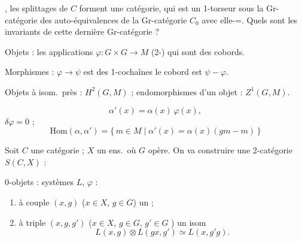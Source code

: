 \documentclass[11pt,a4paper]{article}
\begin{document}
\struck{\ill} , les splittages de $C$ forment une
catégorie, qui est un 1-torseur sous la Gr-catégorie des auto-équivalences
de la Gr-catégorie $C_0$ avec elle-=. Quels sont les invariants de cette
dernière Gr-catégorie ?

Objets : les applications $\varphi : G \times G \to M$
(2-) qui sont des cobords.

Morphismes : $\varphi \to \psi$ est  des 1-cochaînes
 le cobord est $\psi - \varphi$.

Objets à isom.\ près : $H^2(G,M)$ ; endomorphismes d'un objet :
$Z^1(G,M)$.


\[
\alpha'(x) = \alpha(x)\,\varphi(x),
\]
 $\delta\varphi = 0$ ;
\[
\mathrm{Hom}(\alpha, \alpha') = \{\, m \in M \mid \alpha'(x) =
\alpha(x)(gm - m) \,\}
\]


Soit $C$ une catégorie \struck{\ill}  ;
$X$ un ens.\ où $G$ opère. On va construire une 2-catégorie $S(C,X)$ :

0-objets : systèmes $L$, $\varphi$  :

\begin{enumerate}
\item à  couple $(x,g)$ ($x \in X$, $g \in G$) un
 ;
\item à  triple $(x,g,g')$ ($x \in X$, $g \in G$,
$g' \in G$ ) un isom
\[
L(x,g) \otimes L(gx, g') \simeq L(x, g'g).
\]
\end{enumerate}

\end{document}
